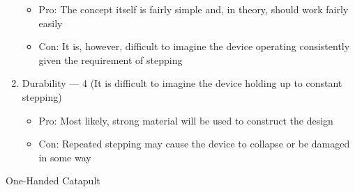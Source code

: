 \begin{enumerate}
    \begin{itemize}

      \item Pro: The concept itself is fairly simple and, in theory, should work fairly easily

      \item Con: It is, however, difficult to imagine the device operating consistently given the requirement of stepping

    \end{itemize}

  \item Durability — 4 (It is difficult to imagine the device holding up to constant stepping)

    \begin{itemize}

      \item Pro: Most likely, strong material will be used to construct the design

      \item Con: Repeated stepping may cause the device to collapse or be damaged in some way

    \end{itemize}

\end{enumerate}

\begin{center}
  One-Handed Catapult
\end{center}

